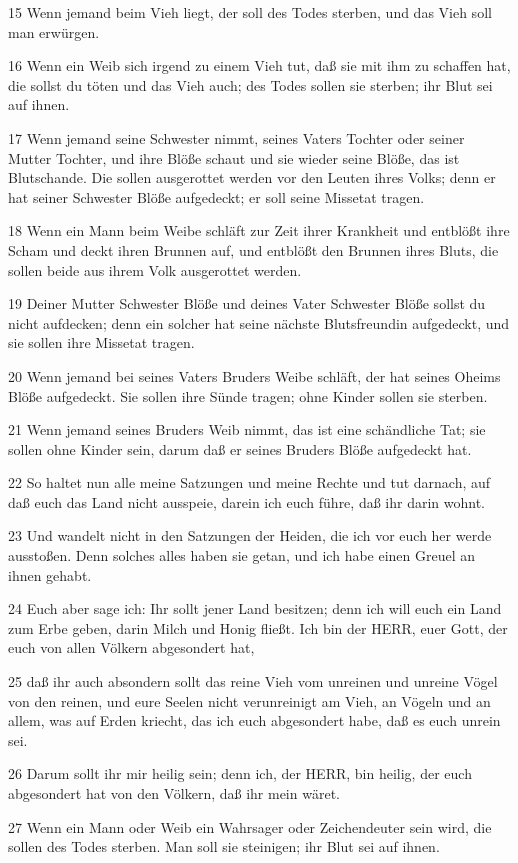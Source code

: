\par 15 Wenn jemand beim Vieh liegt, der soll des Todes sterben, und das Vieh soll man erwürgen.
\par 16 Wenn ein Weib sich irgend zu einem Vieh tut, daß sie mit ihm zu schaffen hat, die sollst du töten und das Vieh auch; des Todes sollen sie sterben; ihr Blut sei auf ihnen.
\par 17 Wenn jemand seine Schwester nimmt, seines Vaters Tochter oder seiner Mutter Tochter, und ihre Blöße schaut und sie wieder seine Blöße, das ist Blutschande. Die sollen ausgerottet werden vor den Leuten ihres Volks; denn er hat seiner Schwester Blöße aufgedeckt; er soll seine Missetat tragen.
\par 18 Wenn ein Mann beim Weibe schläft zur Zeit ihrer Krankheit und entblößt ihre Scham und deckt ihren Brunnen auf, und entblößt den Brunnen ihres Bluts, die sollen beide aus ihrem Volk ausgerottet werden.
\par 19 Deiner Mutter Schwester Blöße und deines Vater Schwester Blöße sollst du nicht aufdecken; denn ein solcher hat seine nächste Blutsfreundin aufgedeckt, und sie sollen ihre Missetat tragen.
\par 20 Wenn jemand bei seines Vaters Bruders Weibe schläft, der hat seines Oheims Blöße aufgedeckt. Sie sollen ihre Sünde tragen; ohne Kinder sollen sie sterben.
\par 21 Wenn jemand seines Bruders Weib nimmt, das ist eine schändliche Tat; sie sollen ohne Kinder sein, darum daß er seines Bruders Blöße aufgedeckt hat.
\par 22 So haltet nun alle meine Satzungen und meine Rechte und tut darnach, auf daß euch das Land nicht ausspeie, darein ich euch führe, daß ihr darin wohnt.
\par 23 Und wandelt nicht in den Satzungen der Heiden, die ich vor euch her werde ausstoßen. Denn solches alles haben sie getan, und ich habe einen Greuel an ihnen gehabt.
\par 24 Euch aber sage ich: Ihr sollt jener Land besitzen; denn ich will euch ein Land zum Erbe geben, darin Milch und Honig fließt. Ich bin der HERR, euer Gott, der euch von allen Völkern abgesondert hat,
\par 25 daß ihr auch absondern sollt das reine Vieh vom unreinen und unreine Vögel von den reinen, und eure Seelen nicht verunreinigt am Vieh, an Vögeln und an allem, was auf Erden kriecht, das ich euch abgesondert habe, daß es euch unrein sei.
\par 26 Darum sollt ihr mir heilig sein; denn ich, der HERR, bin heilig, der euch abgesondert hat von den Völkern, daß ihr mein wäret.
\par 27 Wenn ein Mann oder Weib ein Wahrsager oder Zeichendeuter sein wird, die sollen des Todes sterben. Man soll sie steinigen; ihr Blut sei auf ihnen.

